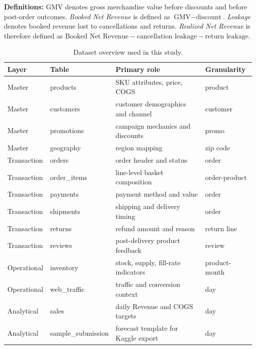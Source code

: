 \documentclass[10pt]{article}
\begin{document}
\textbf{Definitions:} GMV denotes gross merchandise value before discounts and before post-order outcomes. \emph{Booked Net Revenue} is defined as $\text{GMV} - \text{discount}$. \emph{Leakage} denotes booked revenue lost to cancellations and returns. \emph{Realized Net Revenue} is therefore defined as $\text{Booked Net Revenue} - \text{cancellation leakage} - \text{return leakage}$.

\begin{table}[t]
\centering
\caption{Dataset overview used in this study.}
\label{tab:data_overview}
\small
\setlength{\tabcolsep}{4pt}
\begin{tabular}{llll}
\toprule
\textbf{Layer} & \textbf{Table} & \textbf{Primary role} & \textbf{Granularity}\\
\midrule
Master      & products           & SKU attributes, price, COGS         & product \\
Master      & customers          & customer demographics and channel   & customer \\
Master      & promotions         & campaign mechanics and discounts    & promo \\
Master      & geography          & region mapping                      & zip code \\
Transaction & orders             & order header and status             & order \\
Transaction & order\_items       & line-level basket composition       & order-product \\
Transaction & payments           & payment method and value            & order \\
Transaction & shipments          & shipping and delivery timing        & order \\
Transaction & returns            & refund amount and reason            & return line \\
Transaction & reviews            & post-delivery product feedback      & review \\
Operational & inventory          & stock, supply, fill-rate indicators & product-month \\
Operational & web\_traffic       & traffic and conversion context      & day \\
Analytical  & sales              & daily Revenue and COGS targets      & day \\
Analytical  & sample\_submission & forecast template for Kaggle export & day \\
\bottomrule
\end{tabular}
\end{table}
\end{document}

